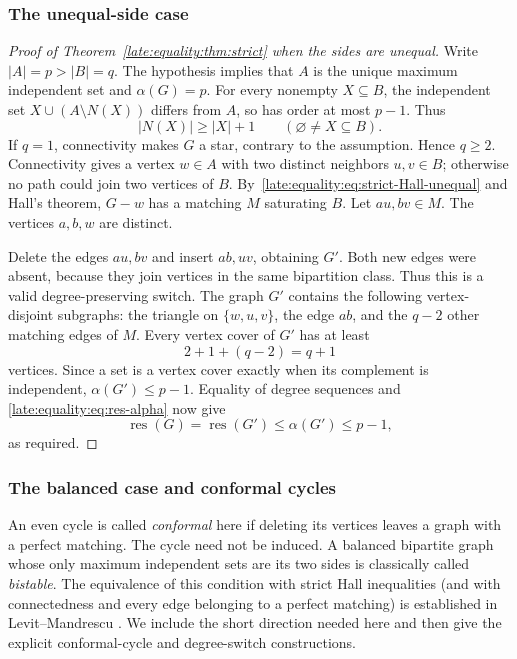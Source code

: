 \documentclass[11pt,a4paper]{article}
\theoremstyle{definition}\newtheorem{definition}[theorem]{Definition}
\theoremstyle{remark}\newtheorem{remark}[theorem]{Remark}
\newcommand{\res}{\operatorname{res}}
\begin{document}
\subsubsection{The unequal-side case}
\begin{proof}[Proof of Theorem~\ref{late:equality:thm:strict} when the sides are unequal]
Write $|A|=p>|B|=q$. The hypothesis implies that $A$ is the unique maximum
independent set and $\alpha(G)=p$. For every nonempty $X\subseteq B$,
the independent set $X\cup(A\setminus N(X))$ differs from $A$, so has
order at most $p-1$. Thus
\begin{equation}\label{late:equality:eq:strict-Hall-unequal}
 |N(X)|\ge |X|+1\qquad(\varnothing\ne X\subseteq B).
\end{equation}
If $q=1$, connectivity makes $G$ a star, contrary to the assumption.
Hence $q\ge2$. Connectivity gives a vertex $w\in A$ with two distinct
neighbors $u,v\in B$; otherwise no path could join two vertices of $B$.
By~\eqref{late:equality:eq:strict-Hall-unequal} and Hall's theorem, $G-w$ has a matching
$M$ saturating $B$. Let $au,bv\in M$. The vertices $a,b,w$ are distinct.

Delete the edges $au,bv$ and insert $ab,uv$, obtaining $G'$. Both new
edges were absent, because they join vertices in the same bipartition
class. Thus this is a valid degree-preserving switch. The graph $G'$
contains the following vertex-disjoint subgraphs: the triangle on
$\{w,u,v\}$, the edge $ab$, and the $q-2$ other matching edges of $M$.
Every vertex cover of $G'$ has at least
\[
 2+1+(q-2)=q+1
\]
vertices. Since a set is a vertex cover exactly when its complement is
independent, $\alpha(G')\le p-1$. Equality of degree sequences and
\eqref{late:equality:eq:res-alpha} now give
\[
 \res(G)=\res(G')\le\alpha(G')\le p-1,
\]
as required.
\end{proof}

\subsubsection{The balanced case and conformal cycles}
An even cycle is called \emph{conformal} here if deleting its vertices
leaves a graph with a perfect matching. The cycle need not be induced. A balanced bipartite graph whose only
maximum independent sets are its two sides is classically called
\emph{bistable}. The equivalence of this condition with strict Hall
inequalities (and with connectedness and every edge belonging to a
perfect matching) is established in Levit--Mandrescu
\cite[Theorem~2.5]{late:equality:LM}. We include the short direction needed here and
then give the explicit conformal-cycle and degree-switch constructions.
\end{document}

